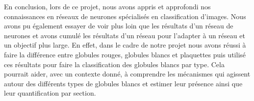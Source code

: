 \label{conclusion}

En conclusion, lors de ce projet, nous avons appris et approfondi nos connaissances en réseaux de neurones spécialisés en classification d'images. Nous avons pu également essayer de voir plus loin que les résultats d'un réseau de neurones et avons cumulé les résultats d'un réseau pour l'adapter à un réseau et un objectif plus large. En effet, dans le cadre de notre projet nous avons réussi à faire la différence entre globules rouges, globules blancs et plaquettes puis utilisé ces résultats pour faire la classification des globules blancs par type. Cela pourrait aider, avec un contexte donné, à comprendre les mécanismes qui agissent autour des différents types de globules blancs et estimer leur présence ainsi que leur quantification par section.